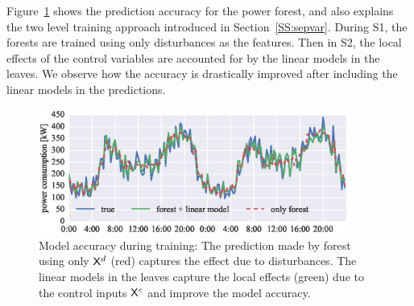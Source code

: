 Figure~\ref{F:sepvars} shows the prediction accuracy for the power forest, and also explains the two level training approach introduced in Section~\ref{SS:sepvar}. During S1, the forests are trained using only disturbances as the features. Then in S2, the local effects of the control variables are accounted for by the linear models in the leaves. We observe how the accuracy is drastically improved after including the linear models in the predictions.

\begin{figure}[h!]
	\centering
	\includegraphics[width=24pc]{figures/eplus_validation.eps}	
	\caption{Model accuracy during training: The prediction made by forest using only $\mathsf{X}^d$ (red) captures the effect due to disturbances. The linear models in the leaves capture the local effects (green) due to the control inputs $\mathsf{X}^c$ and improve the model accuracy.}
	\label{F:sepvars}
	\captionsetup{justification=centering}
\end{figure}


